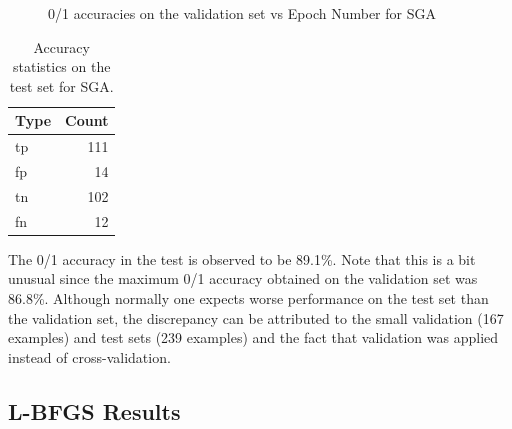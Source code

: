 \documentclass[a4paper]{article}
\begin{document}
\begin{figure}
\caption{\label{fig:valacc}0/1 accuracies on the validation set vs Epoch Number for SGA}
\end{figure}



\begin{table}
\centering
\begin{tabular}{l|r}
Type & Count \\\hline
tp & 111 \\
fp & 14 \\
tn & 102 \\
fn & 12
\end{tabular}
\caption{\label{tab:sgatable}Accuracy statistics on the test set for SGA.}
\end{table}

The 0/1 accuracy in the test is observed to be 89.1\%. Note that this is a bit unusual since the maximum 0/1 accuracy obtained on the validation set was 86.8\%. Although normally one expects worse performance on the test set than the validation set, the discrepancy can be attributed to the small validation (167 examples) and test sets (239 examples) and the fact that validation was applied instead of cross-validation. 

\subsection{L-BFGS Results}
\end{document}

